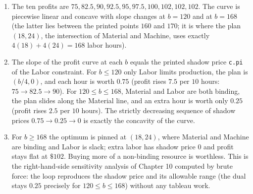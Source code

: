\begin{enumerate}
\item The ten profits are $75, 82.5, 90, 92.5, 95, 97.5, 100, 102, 102, 102$.
The curve is piecewise linear and concave with slope changes at $b = 120$ and
at $b = 168$ (the latter lies between the printed points $160$ and $170$; it
is where the plan $(18,24)$, the intersection of Material and Machine, uses
exactly $4(18) + 4(24) = 168$ labor hours).
\item The slope of the profit curve at each $b$ equals the printed shadow
price \texttt{c.pi} of the Labor constraint. For $b \leq 120$ only Labor
limits production, the plan is $(b/4, 0)$, and each hour is worth $0.75$
(profit rises $7.5$ per $10$ hours: $75 \to 82.5 \to 90$). For
$120 \leq b \leq 168$, Material and Labor are both binding, the plan slides
along the Material line, and an extra hour is worth only $0.25$ (profit rises
$2.5$ per $10$ hours). The strictly decreasing sequence of shadow prices
$0.75 \to 0.25 \to 0$ is exactly the concavity of the curve.
\item For $b \geq 168$ the optimum is pinned at $(18, 24)$, where Material
and Machine are binding and Labor is slack; extra labor has shadow price $0$
and profit stays flat at $\$102$. Buying more of a non-binding resource is
worthless. This is the right-hand-side sensitivity analysis of Chapter 10
computed by brute force: the loop reproduces the shadow price and its
allowable range (the dual stays $0.25$ precisely for
$120 \leq b \leq 168$) without any tableau work.
\end{enumerate}
